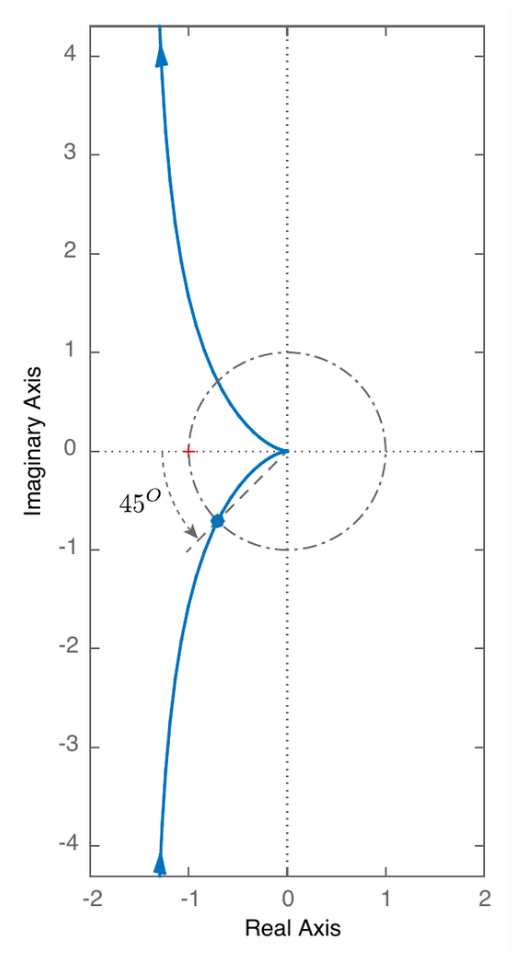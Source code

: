 \documentclass[twoside]{article}
\begin{document}
\begin{minipage}[h]{0.5\linewidth}
    \begin{center}
      \includegraphics[width=0.99\textwidth]{ex4}
    \end{center}
\end{minipage}
\end{document}
